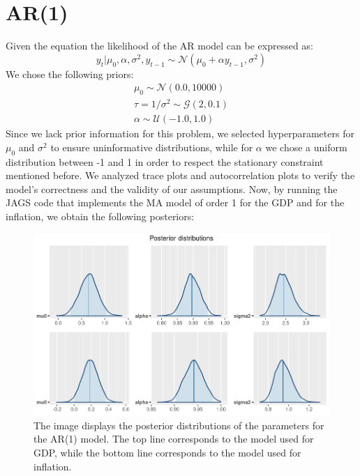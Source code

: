 \section*{AR(1)}
Given the equation  the likelihood of the AR model can be expressed as:
\begin{equation}
    y_{t}|\mu_{0},\alpha,\sigma^2,y_{t-1}\sim \mathcal{N}(\mu_{0} + \alpha y_{t-1}, \sigma^2)
\end{equation}
We chose the following priors:
\begin{equation}
    \begin{split}
        \mu_0 \sim \mathcal{N}(0.0, 10000) \\
        \tau = 1 / \sigma^2 \sim \mathcal{G}(2, 0.1) \\
        \alpha \sim \mathcal{U}(-1.0, 1.0)
    \end{split}
\end{equation}
Since we lack prior information for this problem, we selected hyperparameters for $\mu_{0}$ and $\sigma^2$ to ensure uninformative distributions, while for $\alpha$ we chose a uniform distribution between -1 and 1 in order to respect the stationary constraint mentioned before.
We analyzed trace plots and autocorrelation plots to verify the model's correctness and the validity of our assumptions.
Now, by running the JAGS code that implements the MA model of order 1 for the GDP and for the inflation, we obtain the following posteriors: \\
\begin{figure}[h]
    \centering
    \includegraphics[width=\textwidth]{../Images/2-AR/posteriors.png}
    \caption{The image displays the posterior distributions of the parameters for the AR(1) model. The top line corresponds to the model used for GDP, while the bottom line corresponds to the model used for inflation.}
    \label{fig:AR_posteriors}
\end{figure} \\
